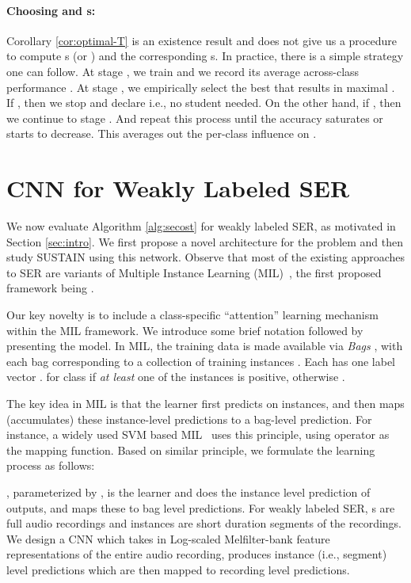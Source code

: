\documentclass{article}
\begin{document}
\noindent \paragraph{Choosing  and s:} \label{sec:choose-bt-alphas}
Corollary \ref{cor:optimal-T} is an existence result and does not give us a procedure to compute s (or ) and the corresponding s. In practice, there is a simple strategy one can follow. 
At stage , we train  and we record its average across-class performance .
At stage , we empirically select the best  that results in maximal . 
If , then we stop and declare  i.e., no student needed. 
On the other hand, if , then we continue to stage . And repeat this process until the accuracy  saturates or starts to decrease. 
This averages out the per-class influence on . 




\section{CNN for Weakly Labeled SER} \label{sec:weakcnn}

We now evaluate Algorithm \ref{alg:secost} for weakly labeled SER, as motivated in Section \ref{sec:intro}. 
We first propose a novel architecture for the problem and then study SUSTAIN using this network. 
Observe that most of the existing approaches to SER are variants of Multiple Instance Learning (MIL)~\cite{dietterich1997solving}, 
the first proposed framework being \cite{kumar2016audio}. 

Our key novelty is to include a class-specific ``attention'' learning mechanism within the MIL framework. 
We introduce some brief notation followed by presenting the model.  
In MIL, the training data  is made available via \emph{Bags} , 
with each bag corresponding to a collection of  training instances . 
Each  has one label vector . 
 for class  if {\it at least} one of the  instances is positive, otherwise . 

The key idea in MIL is that the learner first predicts on instances, 
and then maps (accumulates) these instance-level predictions to a bag-level prediction. 
For instance, a widely used SVM based MIL~\cite{andrews2002support} uses this principle, 
using  operator as the mapping function. 
Based on similar principle, we formulate the learning process as follows: 

, parameterized by , is the learner and does the instance level prediction of outputs, 
and  maps these  to bag level predictions. 
For weakly labeled SER, s are full audio recordings and instances are short duration segments of the recordings. 
We design a CNN which takes in Log-scaled Melfilter-bank feature representations of the entire audio recording, 
produces instance (i.e., segment) level predictions which are then mapped to recording level predictions. 
\end{document}
